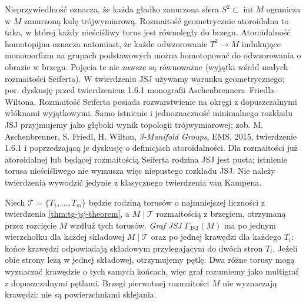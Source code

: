 \begin{uwaga}
Nieprzywiedlność oznacza, że każda gładko zanurzona
sfera $S^2\subset\operatorname{int}M$ ogranicza w $M$
zanurzoną kulę trójwymiarową. Rozmaitość geometrycznie atoroidalna
to taka, w której każdy nieściśliwy torus jest
równoległy do brzegu. Atoroidalność homotopijna
oznacza natomiast, że każde odwzorowanie $T^2\to M$
indukujące monomorfizm na grupach podstawowych
można homotopować do odwzorowania o obrazie w brzegu.
Pojęcia te nie zawsze są równoważne (wyjątki
wśród małych rozmaitości Seiferta). W twierdzeniu
JSJ używamy warunku geometrycznego; por. dyskusję
przed twierdzeniem 1.6.1 monografii
Aschenbrennera--Friedla--Wiltona. Rozmaitość Seiferta posiada
rozwarstwienie na okręgi z dopuszczalnymi włóknami
wyjątkowymi. Samo istnienie i jednoznaczność
minimalnego rozkładu JSJ przyjmujemy jako głęboki
wynik topologii trójwymiarowej; zob.
M. Aschenbrenner, S. Friedl, H. Wilton,
\emph{3-Manifold Groups}, EMS, 2015, twierdzenie 1.6.1
i poprzedzającą je dyskusję o definicjach atoroidalności.
Dla rozmaitości już atoroidalnej lub będącej
rozmaitością Seiferta rodzina JSJ jest pusta;
istnienie torusa nieściśliwego nie wymusza więc
niepustego rozkładu JSJ. Nie należy twierdzenia
wywodzić jedynie z klasycznego twierdzenia
van Kampena.
\end{uwaga}

\begin{definicja}
Niech $\mathcal T=\{T_1,\ldots,T_m\}$ będzie
rodziną torusów o najmniejszej liczności z twierdzenia
\ref{thm:tg-jsj-theorem},
a $M\mid\mathcal T$ rozmaitością z brzegiem,
otrzymaną przez rozcięcie $M$ wzdłuż tych torusów.
\emph{Graf JSJ} $\Gamma_{\mathrm{JSJ}}(M)$ ma po jednym
wierzchołku dla każdej składowej $M\mid\mathcal T$
oraz po jednej krawędzi dla każdego $T_i$;
końce krawędzi odpowiadają składowym przylegającym
do dwóch stron $T_i$. Jeżeli obie strony leżą
w jednej składowej, otrzymujemy pętlę. Dwa różne
torusy mogą wyznaczać krawędzie o tych samych końcach,
więc graf rozumiemy jako multigraf z dopuszczalnymi
pętlami. Brzegi pierwotnej rozmaitości $M$ nie
wyznaczają krawędzi: nie są powierzchniami sklejania.
\end{definicja}

